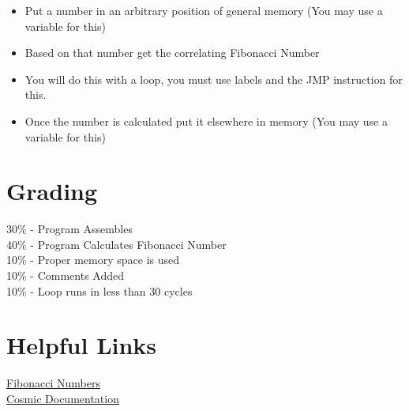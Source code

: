 \documentclass[
	12pt, %
]{fphw}
\begin{document}
\begin{itemize}
  \item Put a number in an arbitrary position of general memory (You may use a variable for this)
  \item Based on that number get the correlating Fibonacci Number
  \item You will do this with a loop, you must use labels and the JMP instruction for this.
  \item Once the number is calculated put it elsewhere in memory (You may use a variable for this)
\end{itemize}


\section*{Grading}

30\% - Program Assembles\\
40\% - Program Calculates Fibonacci Number\\
10\% - Proper memory space is used\\
10\% - Comments Added\\
10\%  - Loop runs in less than 30 cycles\\



\section*{Helpful Links}
\href{https://www.mathsisfun.com/numbers/fibonacci-sequence.html}{Fibonacci Numbers}\\
\href{https://github.com/clbx/Cosmic/tree/master/doc}{Cosmic Documentation}\\

\end{document}
